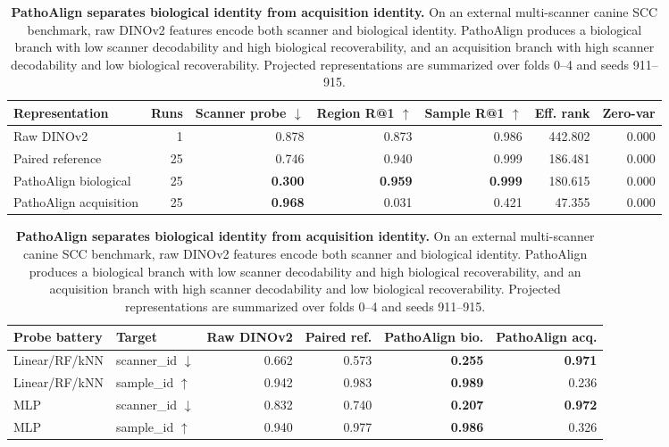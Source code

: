 
\begin{table}[t]
\centering
\small
\caption{\textbf{PathoAlign separates biological identity from acquisition identity.}
On an external multi-scanner canine SCC benchmark, raw DINOv2 features encode both scanner and biological identity.
PathoAlign produces a biological branch with low scanner decodability and high biological recoverability, and an acquisition branch with high scanner decodability and low biological recoverability.
Projected representations are summarized over folds 0--4 and seeds 911--915.}
\label{tab:pathoalign_figure1_benchmark}
\begin{tabular}{lrrrrrr}
\toprule
Representation & Runs & Scanner probe $\downarrow$ & Region R@1 $\uparrow$ & Sample R@1 $\uparrow$ & Eff. rank & Zero-var \\
\midrule
Raw DINOv2 & 1 & 0.878 & 0.873 & 0.986 & 442.802 & 0.000 \\
Paired reference & 25 & 0.746 & 0.940 & 0.999 & 186.481 & 0.000 \\
PathoAlign biological & 25 & \textbf{0.300} & \textbf{0.959} & \textbf{0.999} & 180.615 & 0.000 \\
PathoAlign acquisition & 25 & \textbf{0.968} & 0.031 & 0.421 & 47.355 & 0.000 \\
\bottomrule
\end{tabular}
\vspace{0.5em}

\begin{tabular}{llrrrr}
\toprule
Probe battery & Target & Raw DINOv2 & Paired ref. & PathoAlign bio. & PathoAlign acq. \\
\midrule
Linear/RF/kNN & scanner\_id $\downarrow$ & 0.662 & 0.573 & \textbf{0.255} & \textbf{0.971} \\
Linear/RF/kNN & sample\_id $\uparrow$ & 0.942 & 0.983 & \textbf{0.989} & 0.236 \\
MLP & scanner\_id $\downarrow$ & 0.832 & 0.740 & \textbf{0.207} & \textbf{0.972} \\
MLP & sample\_id $\uparrow$ & 0.940 & 0.977 & \textbf{0.986} & 0.326 \\
\bottomrule
\end{tabular}
\end{table}
